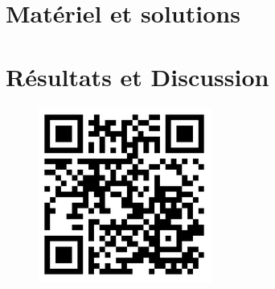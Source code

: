 \documentclass[12pt]{report}
\begin{document}
\begin{onehalfspace}
\chapter{Matériel et solutions}
	
	
\chapter{Résultats et Discussion}
	

\lhead[]{} \rhead[]{} \chead[]{}
\conclusion
	


%

%

\clearpage
{}
\setcounter{tocdepth}{1}
\tableofcontents
{}

\vspace*{1cm}	
	\begin{center}
		\begin{figure}[!h]
			\includegraphics[scale=.2]{images/thesis_project_qrcode.png}
		\end{figure}
	\end{center}


\end{onehalfspace}
\end{document}
